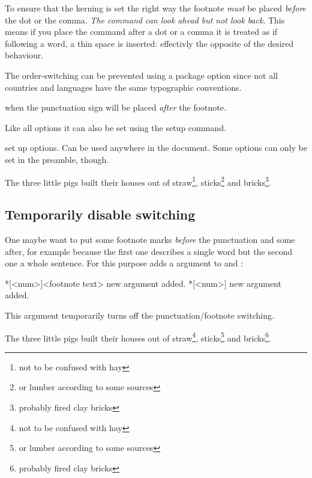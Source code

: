 \documentclass[toc=index,toc=bib]{cnpkgdoc}
\begin{document}
To ensure that the kerning is set the right way the footnote \emph{must} be placed
\emph{before} the dot or the comma. \emph{The command can look ahead but not look back}.
This means if you place the  command after a dot or a comma it is
treated as if following a word, \ie a thin space is inserted: effectivly the opposite 
of the desired behaviour.

The order-switching can be prevented using a package option since not all countries
and languages have the same typographic conventions.
\begin{beschreibung}
  when  the punctuation sign
 will be placed \emph{after} the footnote.
\end{beschreibung}
Like all options it can also be set using the setup command.
\begin{beschreibung}
  set up options. Can be used anywhere in the document.
 Some options can only be set in the preamble, though.
\end{beschreibung}
\begin{beispiel}
 \begin{minipage}{.4\linewidth}
  \noindent The three little pigs built their houses
  out of straw\footnote{not to be confused with hay},
  sticks\footnote{or lumber according to some sources}
  and bricks\footnote{probably fired clay bricks}.
 \end{minipage}
\end{beispiel}

\subsection{Temporarily disable switching}
One maybe want to put some footnote marks \emph{before} the punctuation and some
after, for example because the first one describes a single word but the second
one a whole sentence. For this purpose \fnpct adds a \code{*} argument to 
and :
\begin{beschreibung}
 *[<num>]{<footnote text>} new \code{*} argument added.
 *[<num>] new \code{*} argument added.
\end{beschreibung}
This argument temporarily turns off the punctuation/footnote switching.
\begin{beispiel}
 \begin{minipage}{.4\linewidth}
  \noindent The three little pigs built their houses
  out of straw\footnote*{not to be confused with hay},
  sticks\footnote{or lumber according to some sources}
  and bricks\footnote{probably fired clay bricks}.
 \end{minipage}
\end{beispiel}
\end{document}
